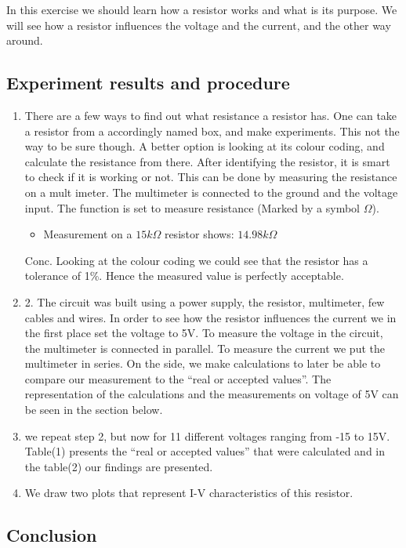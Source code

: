 In this exercise we should learn how a resistor works and what is its purpose. We will see how a resistor influences the voltage and the current, and the other way around.

\subsection{Experiment results and procedure}
\begin{enumerate}
\item There are a few ways to find out what resistance a resistor has. One can take a resistor from a accordingly named box, and make experiments. This not the way to be sure though. A better option is looking at its colour coding, and calculate the resistance from there. After identifying the resistor, it is smart to check if it is working or not. This can be done by measuring the resistance on a mult  imeter.  The multimeter is connected to the ground and the voltage input. The function is set to measure resistance (Marked by a symbol $ \Omega $).
\begin{itemize}
\item Measurement on a $15k\Omega$ resistor shows: $14.98 k\Omega$
\end{itemize}
Conc. Looking at the colour coding we could see that the resistor has a tolerance of 1\%. Hence the measured value is perfectly acceptable. 
 
\item 2.	The circuit was built using a power supply, the resistor, multimeter, few cables and wires. In order to see how the resistor influences the current we in the first place set the voltage to 5V. To measure the voltage in the circuit, the multimeter is connected in parallel. To measure the current we put the multimeter in series. On the side, we make calculations to later be able to compare our measurement to the “real or accepted values”. The representation of the calculations and the measurements on voltage of 5V can be seen in the section below.

\item we repeat step 2, but now for 11 different voltages ranging from -15 to 15V. Table(1) presents the “real or accepted values”  that were calculated and in the table(2) our findings are presented.

\item We draw two plots that represent I-V characteristics of this resistor.
\end{enumerate}

\subsection{Conclusion}